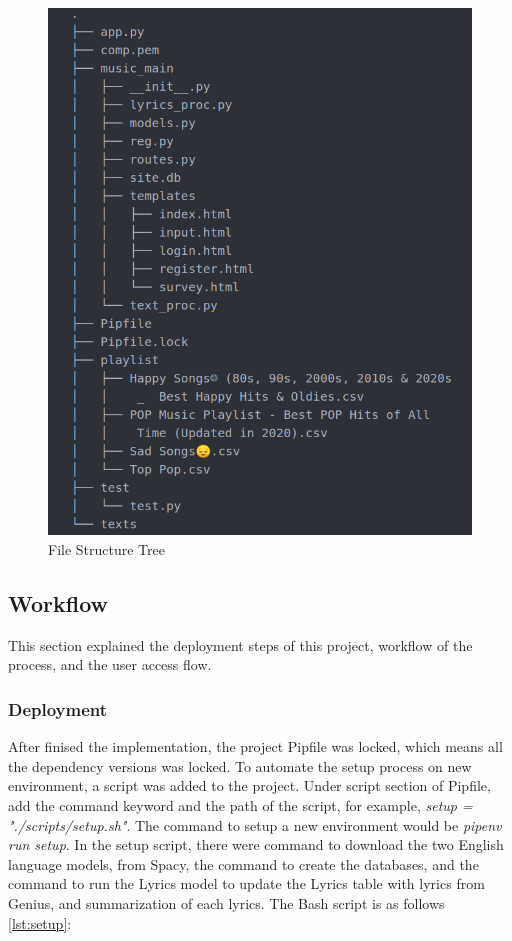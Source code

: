 \begin{figure}[htbp]
\centering
\includegraphics[width=6 in]{images/file-tree}
\caption{File Structure Tree}
\label{tree}
\end{figure}

\subsection{Workflow}

This section explained the deployment steps of this project, workflow of the process,
and the user access flow.

\subsubsection{Deployment}

After finised the implementation, the project Pipfile was locked, which means all
the dependency versions was locked. To automate the setup process on new environment,
a script was added to the project. Under script section of Pipfile, add the command
keyword and the path of the script, for example, \emph{setup = "./scripts/setup.sh"}.
The command to setup a new environment would be \emph{pipenv run setup}. In the
setup script, there were command to download the two English language models, from
Spacy, the command to create the databases, and the command to run the Lyrics
model to update the Lyrics table with lyrics from Genius, and summarization of each
lyrics. The Bash script is as follows \ref{lst:setup}:

